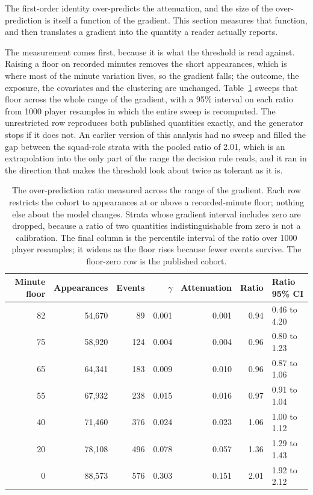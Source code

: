 \documentclass[11pt]{article}
\begin{document}
The first-order identity over-predicts the attenuation, and the size of the over-prediction is itself a function of the gradient. This section measures that function, and then translates a gradient into the quantity a reader actually reports.

The measurement comes first, because it is what the threshold is read against. Raising a floor on recorded minutes removes the short appearances, which is where most of the minute variation lives, so the gradient falls; the outcome, the exposure, the covariates and the clustering are unchanged. Table~\ref{tab:supp_curve} sweeps that floor across the whole range of the gradient, with a 95\% interval on each ratio from 1000 player resamples in which the entire sweep is recomputed. The unrestricted row reproduces both published quantities exactly, and the generator stops if it does not. An earlier version of this analysis had no sweep and filled the gap between the squad-role strata with the pooled ratio of 2.01, which is an extrapolation into the only part of the range the decision rule reads, and it ran in the direction that makes the threshold look about twice as tolerant as it is.

\begin{table}[h]
\centering
\caption{The over-prediction ratio measured across the range of the gradient. Each row restricts the cohort to appearances at or above a recorded-minute floor; nothing else about the model changes. Strata whose gradient interval includes zero are dropped, because a ratio of two quantities indistinguishable from zero is not a calibration. The final column is the percentile interval of the ratio over 1000 player resamples; it widens as the floor rises because fewer events survive. The floor-zero row is the published cohort.}
\label{tab:supp_curve}
\footnotesize
\setlength{\tabcolsep}{5pt}
\begin{tabular}{rrrrrrl}
\toprule
Minute floor & Appearances & Events & $\gamma$ & Attenuation & Ratio & Ratio 95\% CI\\
\midrule
82 & 54,670 & 89 & 0.001 & 0.001 & 0.94 & 0.46 to 4.20\\
75 & 58,920 & 124 & 0.004 & 0.004 & 0.96 & 0.80 to 1.23\\
65 & 64,341 & 183 & 0.009 & 0.010 & 0.96 & 0.87 to 1.06\\
55 & 67,932 & 238 & 0.015 & 0.016 & 0.97 & 0.91 to 1.04\\
40 & 71,460 & 376 & 0.024 & 0.023 & 1.06 & 1.00 to 1.12\\
20 & 78,108 & 496 & 0.078 & 0.057 & 1.36 & 1.29 to 1.43\\
0 & 88,573 & 576 & 0.303 & 0.151 & 2.01 & 1.92 to 2.12\\
\bottomrule
\end{tabular}
\end{table}
\end{document}
